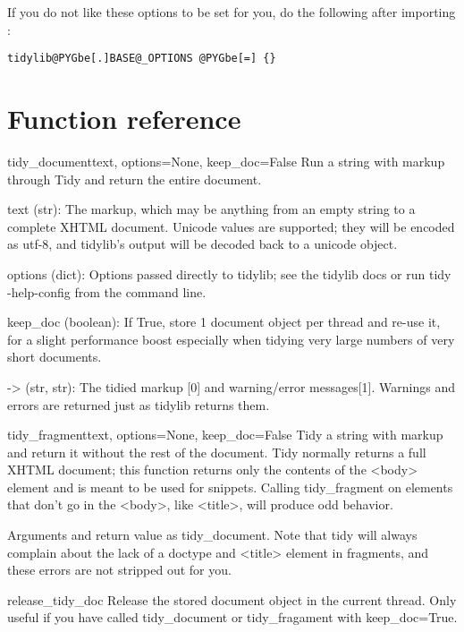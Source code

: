 \documentclass[letterpaper,10pt,english]{howto}
\begin{document}
If you do not like these options to be set for you, do the following after importing :

\begin{Verbatim}[commandchars=@\[\]]
tidylib@PYGbe[.]BASE@_OPTIONS @PYGbe[=] {}
\end{Verbatim}


\section{Function reference}

\hypertarget{tidylib.tidy_document}{}\begin{funcdesc}{tidy\_document}{text, options=None, keep\_doc=False}
Run a string with markup through Tidy and return the entire document.

text (str): The markup, which may be anything from an empty string to a
complete XHTML document. Unicode values are supported; they will be
encoded as utf-8, and tidylib's output will be decoded back to a unicode
object.

options (dict): Options passed directly to tidylib; see the tidylib docs
or run tidy -help-config from the command line.

keep\_doc (boolean): If True, store 1 document object per thread and re-use
it, for a slight performance boost especially when tidying very large numbers
of very short documents.

-\textgreater{} (str, str): The tidied markup {[}0{]} and warning/error messages{[}1{]}.
Warnings and errors are returned just as tidylib returns them.
\end{funcdesc}

\hypertarget{tidylib.tidy_fragment}{}\begin{funcdesc}{tidy\_fragment}{text, options=None, keep\_doc=False}
Tidy a string with markup and return it without the rest of the document.
Tidy normally returns a full XHTML document; this function returns only
the contents of the \textless{}body\textgreater{} element and is meant to be used for snippets.
Calling tidy\_fragment on elements that don't go in the \textless{}body\textgreater{}, like \textless{}title\textgreater{},
will produce odd behavior.

Arguments and return value as tidy\_document. Note that tidy will always
complain about the lack of a doctype and \textless{}title\textgreater{} element in fragments,
and these errors are not stripped out for you.
\end{funcdesc}

\hypertarget{tidylib.release_tidy_doc}{}\begin{funcdesc}{release\_tidy\_doc}{}
Release the stored document object in the current thread. Only useful
if you have called tidy\_document or tidy\_fragament with keep\_doc=True.
\end{funcdesc}


\renewcommand{\indexname}{Module Index}

\renewcommand{\indexname}{Index}
\printindex
\end{document}
